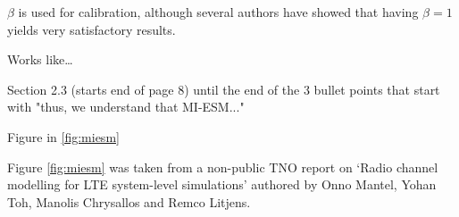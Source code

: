 \label{ap:c}


$\beta$ is used for calibration, although several authors have showed that having $\beta = 1$ yields very satisfactory results.

Works like\dots



Section 2.3 (starts end of page 8) until the end of the 3 bullet points that start with "thus, we understand that MI-ESM..."








Figure in \ref{fig:miesm}




Figure \ref{fig:miesm} was taken from a non-public TNO report on `Radio channel modelling for LTE system-level
simulations' authored by Onno Mantel, Yohan Toh, Manolis Chrysallos and Remco Litjens. 


